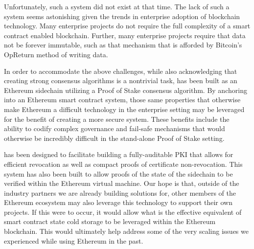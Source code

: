 Unfortunately, such a system did not exist at that time.
The lack of such a system seems astonishing given the trends in
enterprise adoption of blockchain technology.
Many enterprise projects do not require the full complexity of a smart
contract enabled blockchain.
Further, many enterprise projects require that data not be forever
immutable, such as that mechanism that is afforded by Bitcoin's
OpReturn method of writing data.

In order to accommodate the above challenges, while also acknowledging
that creating strong consensus algorithms is a nontrivial task,
\LayerTwo{} has been built as an Ethereum sidechain utilizing a Proof of
Stake consensus algorithm.
By anchoring \LayerTwo{} into an Ethereum smart contract system, those
same properties that otherwise make Ethereum a difficult technology in
the enterprise setting may be leveraged for the benefit of creating a
more secure system.
These benefits include the ability to codify complex governance and
fail-safe mechanisms that would otherwise be incredibly difficult in
the stand-alone Proof of Stake setting.

\LayerTwo{} has been designed to facilitate building a fully-auditable
PKI that allows for efficient revocation as well as compact proofs of
certificate non-revocation.
This system has also been built to allow proofs of the state of the
sidechain to be verified within the Ethereum virtual machine.
Our hope is that, outside of the industry partners we are already
building solutions for, other members of the Ethereum ecosystem may
also leverage this technology to support their own projects.
If this were to occur, it would allow what is the effective equivalent
of smart contract state cold storage to be leveraged within the
Ethereum blockchain.
This would ultimately help address some of the very scaling issues we
experienced while using Ethereum in the past.

